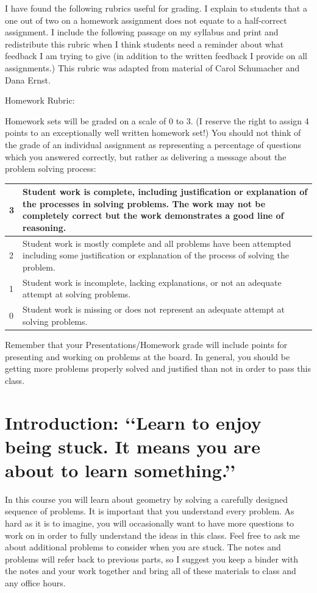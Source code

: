 \begin{annotation}
I have found the following rubrics useful for grading.  I explain to students that a one out of two on a homework assignment does not equate to a half-correct assignment. I include the following passage on my syllabus and print and redistribute this rubric when I think students need a reminder about what feedback I am trying to give (in addition to the written feedback I provide on all assignments.) This rubric was adapted from material of Carol Schumacher and Dana Ernst.

Homework Rubric:

Homework sets will be graded on a scale of 0 to 3. (I reserve the right to assign 4 points to an exceptionally well written homework set!) You should not think of the grade of an individual assignment as representing a percentage of questions which you answered correctly, but rather as delivering a message about the problem solving process:
\newline
\begin{tabular}{|l|p{11cm}|}
\hline
3 & Student work is complete, including justification or explanation of the processes in solving problems. The work may not be completely correct but the work demonstrates a good line of reasoning. \\
\hline
2 & Student work is mostly complete and all problems have been attempted including some justification or explanation of the process of solving the problem.\\
\hline
1 & Student work is incomplete, lacking explanations, or not an adequate attempt at solving problems. \\
\hline
0 & Student work is missing or does not represent an adequate attempt at solving problems. \\
\hline
\end{tabular}

Remember that your Presentations/Homework grade will include points for presenting and working on problems at the board. In general, you should be getting more problems properly solved and justified than not in order to pass this class.

\end{annotation}

\chapter{Introduction: \lq\lq{Learn to enjoy being stuck. It means you are about to learn something.}\rq\rq}


In this course you will learn about geometry by solving a carefully designed sequence of problems.  It is important that you understand every problem. As hard as it is to imagine, you will occasionally want to have more questions to work on in order to fully understand the ideas in this class. Feel free to ask me about additional problems to consider when you are stuck. The notes and problems will refer back to previous parts, so I suggest you keep a binder with the notes and your work together and bring all of these materials to class and any office hours.

